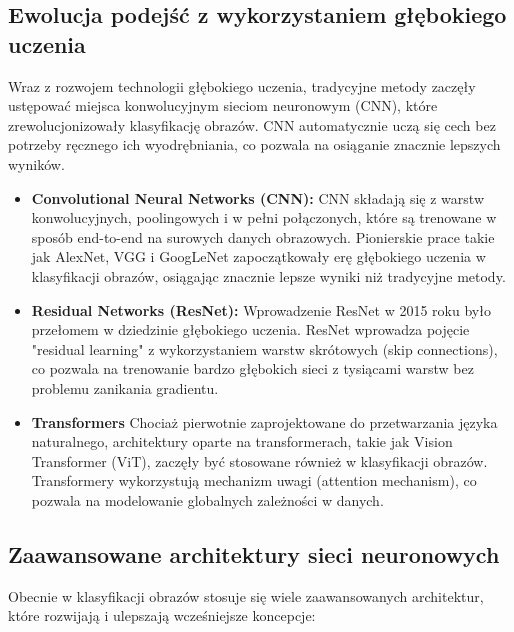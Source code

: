 \subsection*{Ewolucja podejść z wykorzystaniem głębokiego uczenia}

Wraz z rozwojem technologii głębokiego uczenia, tradycyjne metody zaczęły ustępować 
miejsca konwolucyjnym sieciom neuronowym (CNN), które zrewolucjonizowały klasyfikację obrazów. 
CNN automatycznie uczą się cech bez potrzeby ręcznego ich wyodrębniania, co pozwala na osiąganie 
znacznie lepszych wyników. \cite{cnn_overview}

\begin{itemize}
    \item \textbf{Convolutional Neural Networks (CNN):} CNN składają się z warstw konwolucyjnych, 
    poolingowych i w pełni połączonych, które są trenowane w sposób end-to-end na surowych danych 
    obrazowych. Pionierskie prace takie jak AlexNet, VGG i GoogLeNet zapoczątkowały erę głębokiego 
    uczenia w klasyfikacji obrazów, osiągając znacznie lepsze wyniki niż tradycyjne metody. \cite{cnn_survey}
    \item \textbf{Residual Networks (ResNet):}  Wprowadzenie ResNet w 2015 roku było przełomem 
    w dziedzinie głębokiego uczenia. ResNet wprowadza pojęcie "residual learning" z wykorzystaniem 
    warstw skrótowych (skip connections), co pozwala na trenowanie bardzo głębokich sieci z tysiącami 
    warstw bez problemu zanikania gradientu. \cite{resnet} \cite{residual}
    \item \textbf{Transformers} Chociaż pierwotnie zaprojektowane do przetwarzania języka naturalnego, 
    architektury oparte na transformerach, takie jak Vision Transformer (ViT), zaczęły być stosowane 
    również w klasyfikacji obrazów. Transformery wykorzystują mechanizm uwagi (attention mechanism), 
    co pozwala na modelowanie globalnych zależności w danych. \cite{vit_survey}
\end{itemize}

\subsection*{Zaawansowane architektury sieci neuronowych}

Obecnie w klasyfikacji obrazów stosuje się wiele zaawansowanych architektur, 
które rozwijają i ulepszają wcześniejsze koncepcje: \cite{deep3} \cite{soa}

